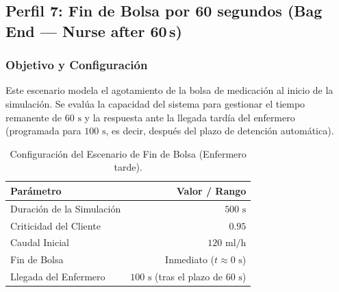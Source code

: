 \documentclass[11pt,a4paper]{article}
\begin{document}
\subsection{Perfil 7: Fin de Bolsa por 60 segundos (Bag End — Nurse after 60\,s)}
\subsubsection{Objetivo y Configuración}
Este escenario modela el agotamiento de la bolsa de medicación al inicio de la simulación. Se evalúa la capacidad del sistema para gestionar el tiempo remanente de $60\text{ s}$ y la respuesta ante la llegada tardía del enfermero (programada para $100\text{ s}$, es decir, después del plazo de detención automática).

\begin{table}[H]
    \centering
    \begin{tabular}{lr}
        \toprule
        \textbf{Parámetro} & \textbf{Valor / Rango} \\
        \midrule
        Duración de la Simulación & $500\text{ s}$ \\
        Criticidad del Cliente & $0.95$ \\
        Caudal Inicial & $120\text{ ml/h}$ \\
        Fin de Bolsa & Inmediato ($t \approx 0\text{ s}$) \\
        Llegada del Enfermero & $100\text{ s}$ (tras el plazo de $60\text{ s}$) \\
        \bottomrule
    \end{tabular}
    \caption{Configuración del Escenario de Fin de Bolsa (Enfermero tarde).}
    \label{tab:config_fin_bolsa_60}
\end{table}
\end{document}
